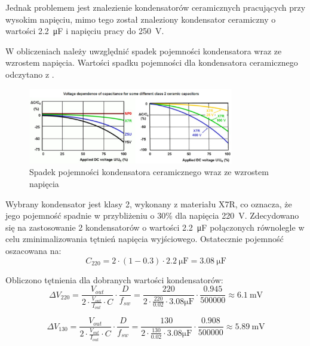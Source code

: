 \documentclass[../../main.tex]{subfiles}
\begin{document}
Jednak problemem jest znalezienie kondensatorów ceramicznych pracujących przy wysokim napięciu, mimo tego został znaleziony kondensator 
ceramiczny o wartości \SI{2.2}{\micro\farad} i napięciu pracy do \SI{250}{\volt}.

W obliczeniach należy uwzględnić spadek pojemności kondensatora wraz ze wzrostem napięcia.
Wartości spadku pojemności dla kondensatora ceramicznego odczytano z \cite{st:ceramic-capacitor}.
\begin{figure}[H]
    \centering
    \includegraphics[width=0.8\textwidth]{napiecia_c.png}
    \caption{Spadek pojemności kondensatora ceramicznego wraz ze wzrostem napięcia \cite{st:capacitors}}
    \label{fig:napiecia_c}
\end{figure}

Wybrany kondensator jest klasy 2, wykonany z materiału X7R, co oznacza, że jego pojemność spadnie w przybliżeniu o 30\% dla napięcia \SI{220}{\volt}.
Zdecydowano się na zastosowanie 2 kondensatorów o wartości \SI{2.2}{\micro\farad} połączonych równolegle w celu zminimalizowania tętnień napięcia wyjściowego.
Ostatecznie pojemność oszacowana na:
\begin{equation}
    C_{220} = 2 \cdot (1-0.3) \cdot \SI{2.2}{\micro\farad} = \SI{3.08}{\micro\farad}
\end{equation}

Obliczono tętnienia dla dobranych wartości kondensatorów:
\begin{equation}
    \Delta V_{220} = \frac{V_{out}}{2 \cdot \frac{V_{out}}{I_{out}} \cdot C} \cdot \frac{D}{f_{sw}} = \frac{220}{2 \cdot \frac{220}{0.02} \cdot 3.08\si{\micro\farad}} \cdot \frac{0.945}{500000} \approx \SI{ 6.1}{\milli\volt}
\end{equation}

\begin{equation}
    \Delta V_{130} = \frac{V_{out}}{2 \cdot \frac{V_{out}}{I_{out}} \cdot C} \cdot \frac{D}{f_{sw}} = \frac{130}{2 \cdot \frac{130}{0.02} \cdot 3.08\si{\micro\farad}} \cdot \frac{0.908}{500000} \approx  \SI{5.89}{\milli\volt}
\end{equation}
\end{document}

